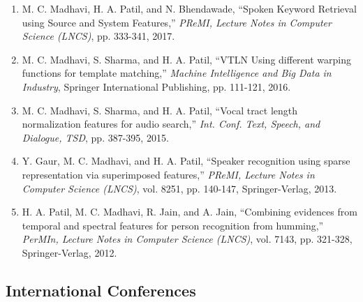 \documentclass[10pt]{article}
\begin{document}
\begin{enumerate}[resume]
\item M. C. Madhavi, H. A. Patil, and N. Bhendawade, ``Spoken Keyword Retrieval using Source and System Features,'' \textit{PReMI, Lecture Notes in Computer Science (LNCS)}, pp. 333-341, 2017.

\item M. C. Madhavi, S. Sharma, and H. A. Patil, ``VTLN Using different warping functions for template matching,'' \textit{Machine Intelligence and Big Data in Industry}, Springer International Publishing, pp. 111-121, 2016.

\item M. C. Madhavi, S. Sharma, and H. A. Patil, ``Vocal tract length normalization features for audio search,'' \textit{Int. Conf. Text, Speech, and Dialogue, TSD}, pp. 387-395, 2015.

\item Y. Gaur, M. C. Madhavi, and H. A. Patil, ``Speaker recognition using sparse representation via superimposed features,'' \textit{PReMI, Lecture Notes in Computer Science (LNCS)}, vol. 8251, pp. 140-147, Springer-Verlag, 2013.

\item H. A. Patil, M. C. Madhavi, R. Jain, and A. Jain, ``Combining evidences from temporal and spectral features for person recognition from humming,'' \textit{PerMIn, Lecture Notes in Computer Science (LNCS)}, vol. 7143, pp. 321-328, Springer-Verlag, 2012.
\end{enumerate}

\subsection*{International Conferences}
\end{document}
